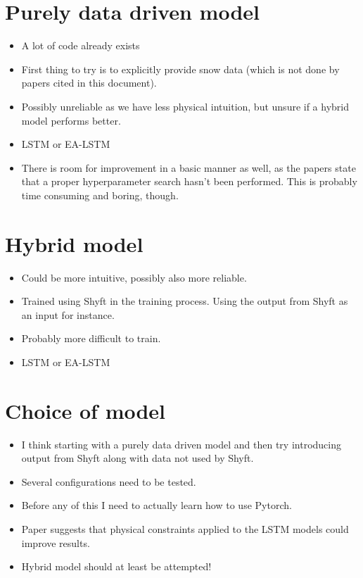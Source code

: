 \documentclass[a4paper,12pt,english]{article}
\begin{document}
\section*{Purely data driven model}
\begin{itemize}
\item A lot of code already exists
\item First thing to try is to explicitly provide snow data (which is not done by papers cited in this document).
\item Possibly unreliable as we have less physical intuition, but unsure if a hybrid model performs better.
\item LSTM or EA-LSTM
\item There is room for improvement in a basic manner as well, as the papers state that a proper hyperparameter search hasn't been performed. This is probably time consuming and boring, though.
\end{itemize}

\section*{Hybrid model}
\begin{itemize}
\item Could be more intuitive, possibly also more reliable.
\item Trained using Shyft in the training process. Using the output from Shyft as an input for instance.
\item Probably more difficult to train.
\item LSTM or EA-LSTM
\end{itemize}

\section*{Choice of model}
\begin{itemize}
\item I think starting with a purely data driven model and then try introducing output from Shyft along with data not used by Shyft.
\item Several configurations need to be tested.
\item Before any of this I need to actually learn how to use Pytorch.
\item Paper \citep{lstm_third_paper} suggests that physical constraints applied to the LSTM models could improve results.
\item Hybrid model should at least be attempted!
\end{itemize}



\end{document}

